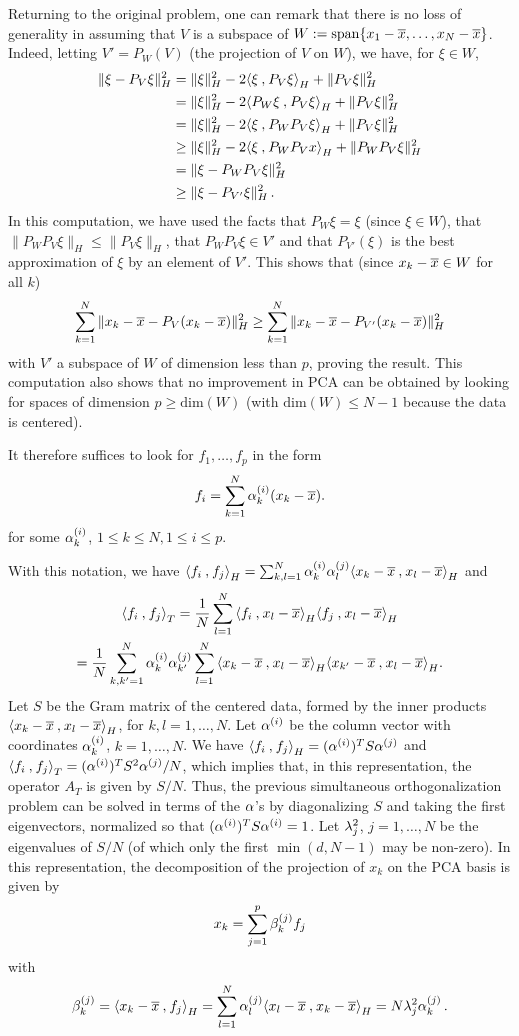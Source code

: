 Returning to the original problem, one can remark that there is no loss of generality in assuming that $V$ is a subspace of $W:=\mathrm{span}\{x_1-\overline{x}, \ldots, x_N-\overline{x}\}$. Indeed, letting $V' = P_W(V)$ (the projection of $V$ on $W$), we have, for $\xi \in W$,
\begin{align*}
\|\xi - P_V \xi\|^2_H &= \|\xi\|^2_H - 2{\langle {\xi}\mathbin{,} {P_V \xi}\rangle}_H + \|P_V \xi\|_H^2 \\
& = \|\xi\|^2_H - 2{\langle {P_W \xi}\mathbin{,} {P_V \xi}\rangle}_H + \|P_V \xi\|_H^2 \\
& = \|\xi\|^2_H - 2{\langle {\xi}\mathbin{,} {P_WP_V \xi}\rangle}_H + \|P_V \xi\|_H^2 \\
& \geq \|\xi\|^2_H - 2{\langle {\xi}\mathbin{,} {P_WP_V x}\rangle}_H + \|P_W P_V \xi\|_H^2 \\
& =  \|\xi - P_W P_V \xi\|_H^2 \\
& \geq  \|\xi - P_{V'} \xi\|_H^2 \,.
\end{align*}
In this computation, we have used the facts that $P_W \xi = \xi$ (since $\xi\in W$), that $\|P_WP_V\xi\|_H \leq \|P_V\xi\|_H$, that $P_WP_V\xi\in V'$ and that $P_{V'}(\xi)$ is the best approximation of $\xi$ by an element of $V'$.
This shows that (since $x_k - \overline{x}\in W$ for all $k$)
\[
\sum_{k=1}^N \|x_k - \overline{x} - P_{V} (x_k -\overline{x})\|_H^2 \geq \sum_{k=1}^N \|x_k-\overline{x} - P_{V'} (x_k-\overline{x})\|_H^2
\]
with $V'$ a subspace of $W$ of dimension less than $p$, proving the result. This computation also shows that no improvement in PCA can be obtained by looking for spaces of dimension $p\geq \mathrm{dim}(W)$ (with $\mathrm{dim}(W)\leq N-1$ because the data is centered). 
\bigskip

It therefore suffices to look for
$f_1, \ldots, f_{p}$ in the form
$$
f_i = \sum_{k=1}^N \alpha_{k}^{(i)} (x_k-\overline{x}).
$$
for some $\alpha_{k}^{(i)}$, $1\leq k\leq N, 1\leq i\leq p$.

With this notation, we have ${\langle {f_i}\mathbin{,} {f_j}\rangle}_H = \sum_{k,l=1}^N
\alpha_{k}^{(i)}\alpha_{l}^{(j)} {\langle {x_k-\overline{x}}\mathbin{,} {x_l-\overline{x}}\rangle}_H$ and
\begin{multline*}
{\langle {f_i}\mathbin{,} {f_j}\rangle}_T = \frac1N \sum_{l=1}^N {\langle {f_i}\mathbin{,} {x_l-\overline{x}}\rangle}_H{\langle {f_j}\mathbin{,} {x_l-\overline{x}}\rangle}_H \\
= \frac1N \sum_{k,k'=1}^N
\alpha_{k}^{(i)}\alpha_{k'}^{(j)} \sum_{l=1}^N {\langle {x_k-\overline{x}}\mathbin{,} {x_l-\overline{x}}\rangle}_H{\langle {x_{k'}-\overline{x}}\mathbin{,} {x_{l}-\overline{x}}\rangle}_H.
\end{multline*}
Let $S$ be the Gram matrix of the centered data, formed by the inner products ${\langle {x_k-\overline{x}}\mathbin{,} {x_l-\overline{x}}\rangle}_H$, for $k,l=1, \ldots, N$. Let $\alpha^{(i)}$ be the column vector with coordinates $\alpha_{k}^{(i)}$, $k=1, \ldots, N$. We
have
${\langle {f_i}\mathbin{,} {f_j}\rangle}_H = (\alpha^{(i)})^TS\alpha^{(j)}$ and ${\langle {f_i}\mathbin{,} {f_j}\rangle}_T = (\alpha^{(i)})^T S^2
\alpha^{(j)}/N$, which implies that, in this representation, the operator $A_T$ is  given by $S/N$. Thus, the previous simultaneous orthogonalization problem can
be solved in terms of the $\alpha$'s by diagonalizing $S$ and taking the first eigenvectors, normalized so that $(\alpha^{(i)})^T S\alpha^{(i)}=1$. Let $\lambda^2_j$, $j=1, \ldots, N$ be the eigenvalues of  $S/N$ (of which only the first $\min(d, N-1)$ may be non-zero). In this representation, the decomposition of the projection of $x_k$ on the PCA basis is given by
\[
x_k = \sum_{j=1}^p \beta_{k}^{(j)} f_j
\]
with
\[
\beta_{k}^{(j)} = {\langle {x_k-\overline{x}}\mathbin{,} {f_j}\rangle}_H = \sum_{l=1}^N \alpha_{l}^{(j)} {\langle {x_l-\overline{x}}\mathbin{,} {x_k-\overline{x}}\rangle}_H = N\lambda_j^2 \alpha_{k}^{(j)}\,.
\]


